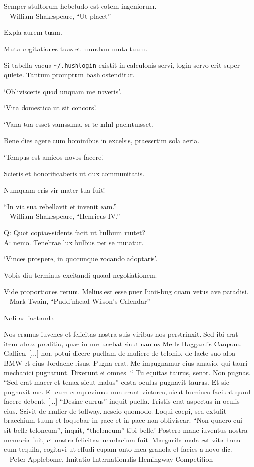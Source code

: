 \documentclass[titlepage,12pt]{memoir}
\begin{document}
Semper stultorum hebetudo est cotem ingeniorum.
\\-- William Shakespeare, “Ut placet”

Expla aurem tuam.

Muta cogitationes tuas et mundum muta tuum.

Si tabella vacua \verb+~/.hushlogin+ existit in calculonis servi, login servo
erit super quiete. Tantum promptum bash ostenditur.

‘Oblivisceris quod unquam me noveris’.

‘Vita domestica ut sit concors’.

‘Vana tua esset vanissima, si te nihil paenituisset’.

Bene dies agere cum hominibus in excelsis, praesertim sola aeria.

‘Tempus est amicos novos facere’.

 Scieris et honorificaberis ut dux communitatis.

Numquam eris vir mater tua fuit!

“In via sua rebellavit et invenit eam.”
\\-- William Shakespeare, “Henricus IV.”

Q: Quot copiae-sidents facit ut bulbum mutet?\\
A: nemo. Tenebrae lux bulbus per se mutatur.

‘Vinces prospere, in quocunque vocando adoptaris’.

Vobis diu terminus excitandi quoad negotiationem.

Vide proportiones rerum. Melius est esse puer Iunii-bug
quam vetus ave paradisi.
\\-- Mark Twain, “Pudd’nhead Wilson’s Calendar”

Noli ad iactando.

Nos eramus iuvenes et felicitas nostra suis viribus nos perstrinxit. Sed ibi erat
item atrox proditio, quae in me iacebat sicut cantus Merle Haggardis
Caupona Gallica. [...]
non potui dicere puellam de muliere de telonio, de lacte suo
alba BMW et eius Jordache risus. Pugna erat. Me impugnamur eius
amasio, qui tauri mechanici pugnarunt. Dixerunt ei omnes: “ Tu equitas
taurus, senor. Non pugnas. “Sed erat macer et tenax sicut malus”
costa oculus pugnavit taurus. Et sic pugnavit me. Et cum complevimus
non erant victores, sicut homines faciunt quod facere debent. [...]
“Desine currus” inquit puella.
Tristis erat aspectus in oculis eius. Scivit de
mulier de tollway. nescio quomodo. Loqui coepi, sed extulit
bracchium tuum et loquebar in pace et in pace non obliviscar.
“Non quaero cui sit belle teloneum”, inquit, “theloneum”
tibi belle.’
Postero mane iuventus nostra memoria fuit, et nostra felicitas mendacium fuit.
Margarita mala est vita bona cum tequila, cogitavi ut effudi cupam
onto mea granola et facies a novo die.
\\-- Peter Applebome, Imitatio Internationalis Hemingway
Competition
\end{document}
